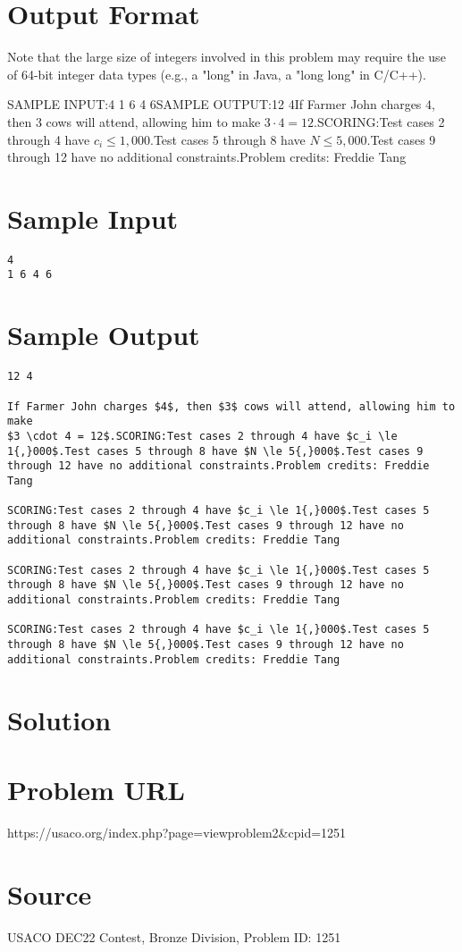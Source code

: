 \documentclass[12pt]{article}
\begin{document}
\section*{Output Format}
Note that the large size of integers involved in this problem may require the
use  of 64-bit integer data types (e.g., a "long" in Java, a "long long" in
C/C++).

SAMPLE INPUT:4
1 6 4 6SAMPLE OUTPUT:12 4If Farmer John charges $4$, then $3$ cows will attend, allowing him to make
$3 \cdot 4 = 12$.SCORING:Test cases 2 through 4 have $c_i \le 1{,}000$.Test cases 5 through 8 have $N \le 5{,}000$.Test cases 9 through 12 have no additional constraints.Problem credits: Freddie Tang

\section*{Sample Input}
\begin{verbatim}
4
1 6 4 6
\end{verbatim}

\section*{Sample Output}
\begin{verbatim}
12 4

If Farmer John charges $4$, then $3$ cows will attend, allowing him to make
$3 \cdot 4 = 12$.SCORING:Test cases 2 through 4 have $c_i \le 1{,}000$.Test cases 5 through 8 have $N \le 5{,}000$.Test cases 9 through 12 have no additional constraints.Problem credits: Freddie Tang

SCORING:Test cases 2 through 4 have $c_i \le 1{,}000$.Test cases 5 through 8 have $N \le 5{,}000$.Test cases 9 through 12 have no additional constraints.Problem credits: Freddie Tang

SCORING:Test cases 2 through 4 have $c_i \le 1{,}000$.Test cases 5 through 8 have $N \le 5{,}000$.Test cases 9 through 12 have no additional constraints.Problem credits: Freddie Tang

SCORING:Test cases 2 through 4 have $c_i \le 1{,}000$.Test cases 5 through 8 have $N \le 5{,}000$.Test cases 9 through 12 have no additional constraints.Problem credits: Freddie Tang
\end{verbatim}

\section*{Solution}


\section*{Problem URL}
https://usaco.org/index.php?page=viewproblem2&cpid=1251

\section*{Source}
USACO DEC22 Contest, Bronze Division, Problem ID: 1251
\end{document}
